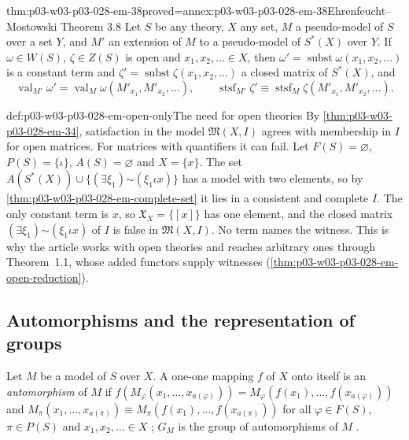 \begin{hbtheorem}{thm:p03-w03-p03-028-em-38}{proved=annex:p03-w03-p03-028-em-38}{Ehrenfeucht--Mostowski Theorem 3.8}
Let \(S\) be any theory, \(X\) any set, \(M\) a pseudo-model of \(S\) over a
set \(Y\), and \(M'\) an extension of \(M\) to a pseudo-model of \(S^*(X)\)
over \(Y\).  If \(\omega\in W(S)\), \(\zeta\in Z(S)\) is open and
\(x_1,x_2,\ldots\in X\), then
\(\omega'=\operatorname{subst}\omega(x_1,x_2,\ldots)\) is a constant term and
\(\zeta'=\operatorname{subst}\zeta(x_1,x_2,\ldots)\) a closed matrix of
\(S^*(X)\), and \cite[Theorem~3.8, p.~55]{EhrenfeuchtMostowski1956}
\[
  \operatorname{val}_{M'}\omega'
   =\operatorname{val}_M\omega(M'_{x_1},M'_{x_2},\ldots),\qquad
  \operatorname{stsf}_{M'}\zeta'
   \equiv\operatorname{stsf}_M\zeta(M'_{x_1},M'_{x_2},\ldots).
\]
\end{hbtheorem}

\begin{hbwarning}{def:p03-w03-p03-028-em-open-only}{The need for open theories}
By \cref{thm:p03-w03-p03-028-em-34}, satisfaction in the model
\(\mathfrak M(X,I)\) agrees with membership in \(I\) for open matrices.
For matrices with quantifiers it can fail.  Let \(F(S)=\varnothing\),
\(P(S)=\{\iota\}\), \(A(S)=\varnothing\) and \(X=\{x\}\).  The set
\(A(S^*(X))\cup\{(\exists\xi_1)\mathord\sim(\xi_1\iota x)\}\) has a model with
two elements, so by \cref{thm:p03-w03-p03-028-em-complete-set} it lies in a
consistent and complete \(I\).  The only constant term is \(x\), so
\(\mathfrak X_X=\{[x]\}\) has one element, and the closed matrix
\((\exists\xi_1)\mathord\sim(\xi_1\iota x)\) of \(I\) is false in
\(\mathfrak M(X,I)\).  No term names the witness.  This is why the article
works with open theories and reaches arbitrary ones through Theorem~1.1,
whose added functors supply witnesses
(\cref{thm:p03-w03-p03-028-em-open-reduction}).
\end{hbwarning}

\subsection{Automorphisms and the representation of groups}
\label{sec:p03-w03-p03-028-em-automorphisms}

Let \(M\) be a model of \(S\) over \(X\).  A one-one mapping \(f\) of \(X\)
onto itself is an \emph{automorphism} of \(M\) if
\(f(M_\varphi(x_1,\ldots,x_{a(\varphi)}))=M_\varphi(f(x_1),\ldots,f(x_{a(\varphi)}))\)
and
\(M_\pi(x_1,\ldots,x_{a(\pi)})\equiv M_\pi(f(x_1),\ldots,f(x_{a(\pi)}))\)
for all \(\varphi\in F(S)\), \(\pi\in P(S)\) and \(x_1,x_2,\ldots\in X\)
\cite[p.~55]{EhrenfeuchtMostowski1956}; \(G_M\) is the group of automorphisms
of \(M\) \cite[p.~56]{EhrenfeuchtMostowski1956}.

